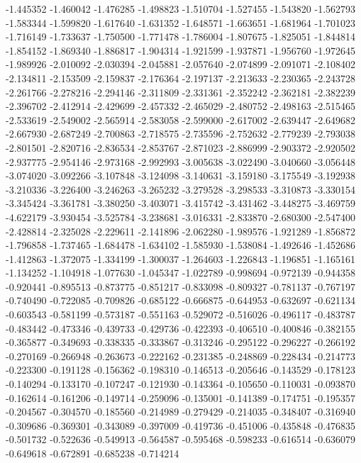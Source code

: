 -1.445352
-1.460042
-1.476285
-1.498823
-1.510704
-1.527455
-1.543820
-1.562793
-1.583344
-1.599820
-1.617640
-1.631352
-1.648571
-1.663651
-1.681964
-1.701023
-1.716149
-1.733637
-1.750500
-1.771478
-1.786004
-1.807675
-1.825051
-1.844814
-1.854152
-1.869340
-1.886817
-1.904314
-1.921599
-1.937871
-1.956760
-1.972645
-1.989926
-2.010092
-2.030394
-2.045881
-2.057640
-2.074899
-2.091071
-2.108402
-2.134811
-2.153509
-2.159837
-2.176364
-2.197137
-2.213633
-2.230365
-2.243728
-2.261766
-2.278216
-2.294146
-2.311809
-2.331361
-2.352242
-2.362181
-2.382239
-2.396702
-2.412914
-2.429699
-2.457332
-2.465029
-2.480752
-2.498163
-2.515465
-2.533619
-2.549002
-2.565914
-2.583058
-2.599000
-2.617002
-2.639447
-2.649682
-2.667930
-2.687249
-2.700863
-2.718575
-2.735596
-2.752632
-2.779239
-2.793038
-2.801501
-2.820716
-2.836534
-2.853767
-2.871023
-2.886999
-2.903372
-2.920502
-2.937775
-2.954146
-2.973168
-2.992993
-3.005638
-3.022490
-3.040660
-3.056448
-3.074020
-3.092266
-3.107848
-3.124098
-3.140631
-3.159180
-3.175549
-3.192938
-3.210336
-3.226400
-3.246263
-3.265232
-3.279528
-3.298533
-3.310873
-3.330154
-3.345424
-3.361781
-3.380250
-3.403071
-3.415742
-3.431462
-3.448275
-3.469759
-4.622179
-3.930454
-3.525784
-3.238681
-3.016331
-2.833870
-2.680300
-2.547400
-2.428814
-2.325028
-2.229611
-2.141896
-2.062280
-1.989576
-1.921289
-1.856872
-1.796858
-1.737465
-1.684478
-1.634102
-1.585930
-1.538084
-1.492646
-1.452686
-1.412863
-1.372075
-1.334199
-1.300037
-1.264603
-1.226843
-1.196851
-1.165161
-1.134252
-1.104918
-1.077630
-1.045347
-1.022789
-0.998694
-0.972139
-0.944358
-0.920441
-0.895513
-0.873775
-0.851217
-0.833098
-0.809327
-0.781137
-0.767197
-0.740490
-0.722085
-0.709826
-0.685122
-0.666875
-0.644953
-0.632697
-0.621134
-0.603543
-0.581199
-0.573187
-0.551163
-0.529072
-0.516026
-0.496117
-0.483787
-0.483442
-0.473346
-0.439733
-0.429736
-0.422393
-0.406510
-0.400846
-0.382155
-0.365877
-0.349693
-0.338335
-0.333867
-0.313246
-0.295122
-0.296227
-0.266192
-0.270169
-0.266948
-0.263673
-0.222162
-0.231385
-0.248869
-0.228434
-0.214773
-0.223300
-0.191128
-0.156362
-0.198310
-0.146513
-0.205646
-0.143529
-0.178123
-0.140294
-0.133170
-0.107247
-0.121930
-0.143364
-0.105650
-0.110031
-0.093870
-0.162614
-0.161206
-0.149714
-0.259096
-0.135001
-0.141389
-0.174751
-0.195357
-0.204567
-0.304570
-0.185560
-0.214989
-0.279429
-0.214035
-0.348407
-0.316940
-0.309686
-0.369301
-0.343089
-0.397009
-0.419736
-0.451006
-0.435848
-0.476835
-0.501732
-0.522636
-0.549913
-0.564587
-0.595468
-0.598233
-0.616514
-0.636079
-0.649618
-0.672891
-0.685238
-0.714214
